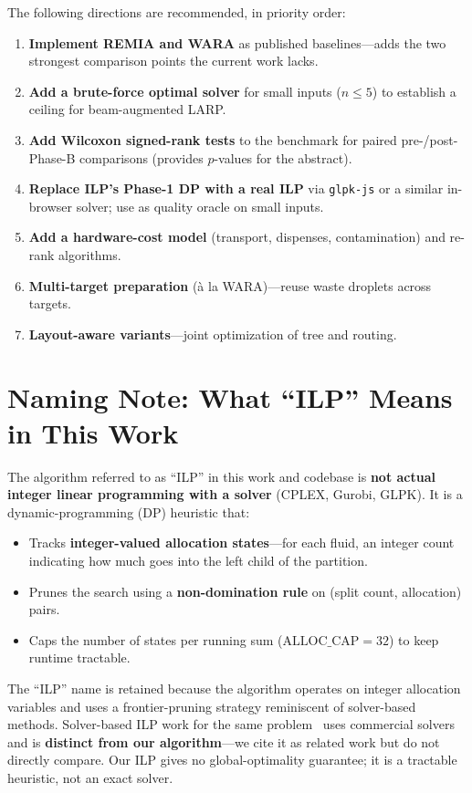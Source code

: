 The following directions are recommended, in priority order:

\begin{enumerate}
    \item \textbf{Implement REMIA and WARA} as published baselines---adds the two strongest comparison points the current work lacks.
    
    \item \textbf{Add a brute-force optimal solver} for small inputs ($n \leq 5$) to establish a ceiling for beam-augmented LARP.
    
    \item \textbf{Add Wilcoxon signed-rank tests} to the benchmark for paired pre-/post-Phase-B comparisons (provides $p$-values for the abstract).
    
    \item \textbf{Replace ILP's Phase-1 DP with a real ILP} via \texttt{glpk-js} or a similar in-browser solver; use as quality oracle on small inputs.
    
    \item \textbf{Add a hardware-cost model} (transport, dispenses, contamination) and re-rank algorithms.
    
    \item \textbf{Multi-target preparation} (\`{a} la WARA)---reuse waste droplets across targets.
    
    \item \textbf{Layout-aware variants}---joint optimization of tree and routing.
\end{enumerate}

\section{Naming Note: What ``ILP'' Means in This Work}
\label{sec:ilp_naming}

The algorithm referred to as ``ILP'' in this work and codebase is \textbf{not actual integer linear programming with a solver} (CPLEX, Gurobi, GLPK). It is a dynamic-programming (DP) heuristic that:

\begin{itemize}
    \item Tracks \textbf{integer-valued allocation states}---for each fluid, an integer count indicating how much goes into the left child of the partition.
    \item Prunes the search using a \textbf{non-domination rule} on (split count, allocation) pairs.
    \item Caps the number of states per running sum ($\text{ALLOC\_CAP} = 32$) to keep runtime tractable.
\end{itemize}

The ``ILP'' name is retained because the algorithm operates on integer allocation variables and uses a frontier-pruning strategy reminiscent of solver-based methods. Solver-based ILP work for the same problem~\cite{ilp_ieee2016} uses commercial solvers and is \textbf{distinct from our algorithm}---we cite it as related work but do not directly compare. Our ILP gives no global-optimality guarantee; it is a tractable heuristic, not an exact solver.
